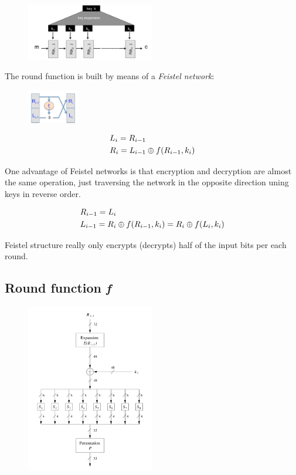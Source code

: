 \documentclass[a4paper,12pt]{article}
\begin{document}
\begin{figure}[H]
  \centering
  \includegraphics[width=0.5\textwidth]{img/key-schedule}
\end{figure}

The round function is built by means of a \textit{Feistel network}:

\begin{figure}[H]
  \centering
  \includegraphics[width=0.2\textwidth]{img/feistel}
\end{figure}

\begin{align}
&L_i = R_{i-1} \notag\\
&R_i = L_{i-1} \oplus f(R_{i-1}, k_i) \notag
\end{align}

One advantage of Feistel networks is that encryption and decryption are almost the same operation, just traversing the network in the opposite direction uning keys in reverse order.

\begin{align}
&R_{i-1} = L_i \notag\\
&L_{i-1} = R_i \oplus f(R_{i-1}, k_i) = R_i \oplus f(L_i, k_i) \notag
\end{align}

Feistel structure really only encrypts (decrypts) half of the input bits per each round.

\subsection{Round function \textit{f}}

\begin{figure}[H]
  \centering
  \includegraphics[width=0.5\textwidth]{img/round-func}
\end{figure}
\end{document}
